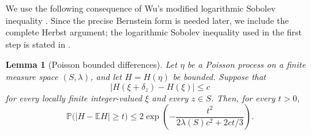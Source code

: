 \documentclass[12pt]{amsart}
\newtheorem{lemma}[lemma]{Lemma}
\theoremstyle{definition}
\newcommand{\1}{\mathbf 1}
\newcommand{\abs}[1]{\left\lvert#1\right\rvert}
\begin{document}
We use the following consequence of Wu's modified logarithmic Sobolev inequality \cite{Wu}. Since the precise Bernstein form is needed later, we include the complete Herbst argument; the logarithmic Sobolev inequality used in the first step is stated in \cite[Theorem~1.1]{BachmannPeccati}.

\begin{lemma}[Poisson bounded differences]\label{lem:poisson-bd}
Let $\eta$ be a Poisson process on a finite measure space $(S,\lambda)$, and let $H=H(\eta)$ be bounded. Suppose that
\[
 \abs{H(\xi+\delta_z)-H(\xi)}\leq c
\]
for every locally finite integer-valued $\xi$ and every $z\in S$. Then, for every $t>0$,
\begin{equation}\label{eq:poisson-bd}
 \mathbb P\bigl(\abs{H-\mathbb EH}\geq t\bigr)
 \leq2\exp\left(-\frac{t^2}{2\lambda(S)c^2+2ct/3}\right).
\end{equation}
\end{lemma}
\end{document}
